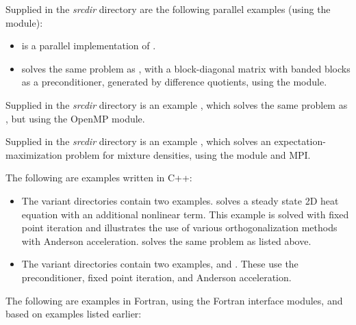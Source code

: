 \vspace{0.2in}\noindent
Supplied in the
{\em srcdir} directory are the
following parallel examples (using the {\nvecp} module):
\begin{itemize}
\item {}
  is a parallel implementation of .
\item {}
  solves the same problem as , with a block-diagonal matrix
  with banded blocks as a preconditioner, generated by difference quotients,
  using the {\kinbbdpre} module.
\end{itemize}

\vspace{0.2in}\noindent
Supplied in the {\em srcdir} directory
is an example , which solves the same problem
as , but using the OpenMP {\nvector} module.

\vspace{0.2in}\noindent
Supplied in the {\em srcdir} directory
is an example , which solves an
expectation-maximization problem for mixture densities, using the
 {\nvector} module and MPI.

\vspace{0.2in}\noindent 
The following are examples written in C++:
\begin{itemize}

\item The  variant directories contain two examples.
   solves a
  steady state 2D heat equation with an additional nonlinear term.
  This example is solved with fixed point iteration and illustrates
  the use of various orthogonalization methods with Anderson
  acceleration.
   solves the same problem as 
  listed above.

\item The  variant directories contain two examples,
   and
  .  These use the 
   preconditioner, fixed point iteration, and Anderson
  acceleration.

\end{itemize}
  
\vspace{0.2in}\noindent
The following are examples in Fortran, using the {\sundials}
Fortran interface modules, and based on examples listed earlier:

